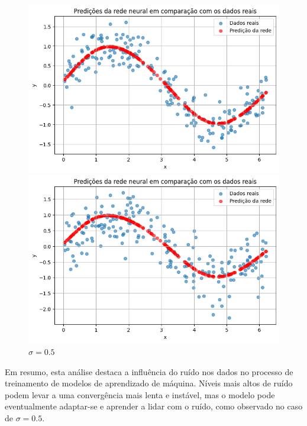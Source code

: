 \begin{figure}[htb]
\begin{minipage}{0.45\textwidth}
		\includegraphics[width=\textwidth]{./0803_imgs/0365_tarefa05/png-241110-192954147-5354434943605266969.png}
	\end{minipage}
	\hfill
	\begin{minipage}{0.45\textwidth}
		\centering
		\caption{$\sigma=0.5$}\label{fig:tarefa05:05:predicoes}
		\includegraphics[width=\textwidth]{./0803_imgs/0365_tarefa05/png-241110-193141249-12530547749698557937.png}
	\end{minipage}
\end{figure}



Em resumo, esta análise destaca a influência do ruído nos dados no processo de 
treinamento de modelos de aprendizado de máquina. Níveis mais altos de ruído 
podem levar a uma convergência mais lenta e instável, mas o modelo pode 
eventualmente adaptar-se e aprender a lidar com o ruído, como observado no caso 
de $\sigma=\num{0,5}$.
